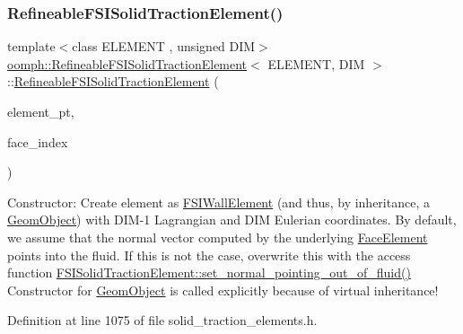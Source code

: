 \subsubsection{\texorpdfstring{Refineable\+F\+S\+I\+Solid\+Traction\+Element()}{RefineableFSISolidTractionElement()}}
{\footnotesize\ttfamily template$<$class E\+L\+E\+M\+E\+NT , unsigned D\+IM$>$ \\
\hyperlink{classoomph_1_1RefineableFSISolidTractionElement}{oomph\+::\+Refineable\+F\+S\+I\+Solid\+Traction\+Element}$<$ E\+L\+E\+M\+E\+NT, D\+IM $>$\+::\hyperlink{classoomph_1_1RefineableFSISolidTractionElement}{Refineable\+F\+S\+I\+Solid\+Traction\+Element} (\begin{DoxyParamCaption}\item[{\hyperlink{classoomph_1_1FiniteElement}{Finite\+Element} $\ast$const \&}]{element\+\_\+pt,  }\item[{const int \&}]{face\+\_\+index }\end{DoxyParamCaption})\hspace{0.3cm}{\ttfamily [inline]}}



Constructor\+: Create element as \hyperlink{classoomph_1_1FSIWallElement}{F\+S\+I\+Wall\+Element} (and thus, by inheritance, a \hyperlink{classoomph_1_1GeomObject}{Geom\+Object}) with D\+I\+M-\/1 Lagrangian and D\+IM Eulerian coordinates. By default, we assume that the normal vector computed by the underlying \hyperlink{classoomph_1_1FaceElement}{Face\+Element} points into the fluid. If this is not the case, overwrite this with the access function \hyperlink{classoomph_1_1FSISolidTractionElement_aaa745c32fe53e76ac0b9d1b00a05fe36}{F\+S\+I\+Solid\+Traction\+Element\+::set\+\_\+normal\+\_\+pointing\+\_\+out\+\_\+of\+\_\+fluid()} Constructor for \hyperlink{classoomph_1_1GeomObject}{Geom\+Object} is called explicitly because of virtual inheritance! 



Definition at line 1075 of file solid\+\_\+traction\+\_\+elements.\+h.

\mbox{\label{classoomph_1_1RefineableFSISolidTractionElement_a93dba5ec7c731196a4963734543c9395}} 
